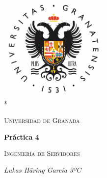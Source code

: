 \documentclass[12pt,a4paper]{article}
\date{\specialdate\today}
\begin{document}
	\begin{titlepage}
		\centering
		\includegraphics[width=0.4\textwidth]{logo-ugr.png}\\*
		{\scshape\LARGE Universidad de Granada \par}
		{\large \date{\specialdate\today}\par}
		\vspace{1cm}
		{\LARGE\bfseries Práctica 4\par}
		\vspace{1.5cm}
		{\scshape\large Ingeniería de Servidores\par}
		\vspace{2cm}
		{\Large\itshape Lukas Häring García 3ºC\par}
	\end{titlepage}
	
	\tableofcontents
	
	\newpage
	
	
	
	
\end{document}
